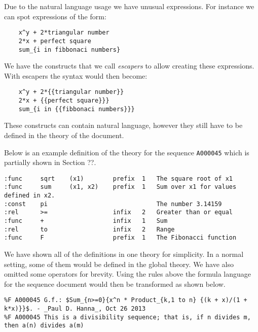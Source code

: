 Due to the natural language usage we have unusual expressions. For instance we can spot expressions of the form:
\begin{verbatim}
    x^y + 2*triangular number
    2*x + perfect square
    sum_{i in fibbonaci numbers}
\end{verbatim}
We have the constructs that we call \emph{escapers} to allow creating these expressions. With escapers the syntax
would then become:

\begin{verbatim}
    x^y + 2*{{triangular number}}
    2*x + {{perfect square}}}
    sum_{i in {{fibbonaci numbers}}}
\end{verbatim}

These constructs can contain natural language, however they still have to be defined in the theory of the document.

Below is an example definition of the theory for the sequence \verb|A000045| which is partially shown in Section ??.

\renewcommand{\lstlistingname}{Theory}

\begin{lstlisting}[label=lst:theoryA000045,caption=Example theory for A000045]
:func     sqrt    (x1)        prefix  1   The square root of x1
:func     sum     (x1, x2)    prefix  1   Sum over x1 for values defined in x2.
:const    pi                              The number 3.14159
:rel      >=                  infix   2   Greater than or equal
:func     +                   infix   1   Sum
:rel      to                  infix   2   Range
:func     F                   prefix  1   The Fibonacci function
\end{lstlisting}

We have shown all of the definitions in one theory for simplicity. In a normal setting, some of them would be defined
 in the global theory. We have also omitted some operators for brevity.
Using the rules above the formula language for the sequence document would then be transformed as shown below.

\begin{lstlisting}[caption=Adjusted A000045 based on Theory \ref{lst:theoryA000045}]
%F A000045 $F(n) = ((1+sqrt(5))^n-(1-sqrt(5))^n)/(2^n*sqrt(5))$
%F A000045 G.f.: $Sum_{n>=0}{x^n * Product_{k,1 to n} {(k + x)/(1 + k*x)}}$. - _Paul D. Hanna_, Oct 26 2013
%F A000045 This is a divisibility sequence; that is, if n divides m, then a(n) divides a(m)
\end{lstlisting}

